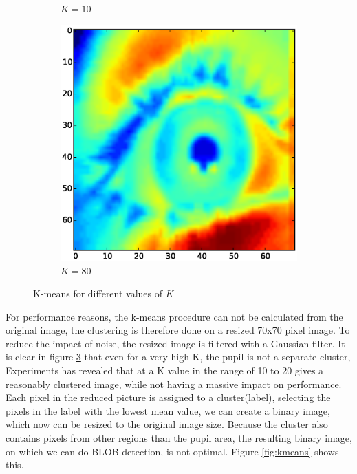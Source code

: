 \documentclass[a4paper,11pt]{article}
\begin{document}
\begin{figure}[H]
\begin{subfigure}{.33\textwidth}
  \caption{$K=10$}
  \label{fig:kmeans_sub2}
\end{subfigure}
\begin{subfigure}{.33\textwidth}
  \centering
  \includegraphics[width=1\linewidth]{kmean_k80_v70}
  \caption{$K=80$}
  \label{fig:kmeans_sub3}
\end{subfigure}
\caption{K-means for different values of $K$}
\label{fig:kmeans_small}
\end{figure}

For performance reasons, the k-means procedure can not be calculated from the original image, the clustering is therefore done on a resized 70x70 pixel image. To reduce the impact of noise, the resized image is filtered with a Gaussian filter. It is clear in figure \ref{fig:kmeans_small} that even for a very high K, the pupil is not a separate cluster, Experiments has revealed that at a K value in the range of 10 to 20 gives a reasonably clustered image, while not having a massive impact on performance.\\

Each pixel in the reduced picture is assigned to a cluster(label), selecting the pixels in the label with the lowest mean value, we can create a binary image, which now can be resized to the original image size. Because the cluster also contains pixels from other regions than the pupil area, the resulting binary image, on which we can do BLOB detection, is not optimal. Figure \ref{fig:kmeans} shows this.
\end{document}
